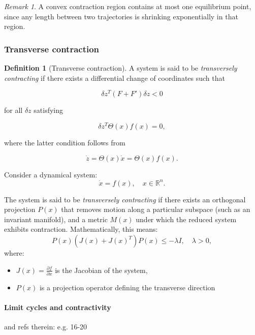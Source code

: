 \documentclass{article}
\theoremstyle{definition} \newtheorem{definition}{Definition}
\theoremstyle{remark} \newtheorem{remark}{Remark}
\newcounter{ct}
\begin{document}
\begin{remark}
A convex contraction region contains at most one equilibrium point, since any length between two trajectories is shrinking exponentially in that region.
\end{remark}

\subsubsection{Transverse contraction}
\begin{definition}[Transverse contraction] 
A system is said to be \textit{transversely contracting} if there exists a differential change of coordinates such that  

\[
\delta z^T (F + F') \delta z < 0
\]

for all \( \delta z \) satisfying  

\[
\delta z^T \Theta(x) f(x) = 0,
\]

where the latter condition follows from  

\[
\dot{z} = \Theta(x) \dot{x} = \Theta(x) f(x).
\]

\end{definition}

Consider a dynamical system:
\begin{equation}
    \dot{x} = f(x), \quad x \in \mathbb{R}^n.
\end{equation}

The system is said to be \textit{transversely contracting} if there exists an orthogonal projection $P(x)$ that removes motion along a particular subspace (such as an invariant manifold), and a metric $M(x)$ under which the reduced system exhibits contraction. Mathematically, this means:
\begin{equation}
    P(x) (J(x) + J(x)^T) P(x) \leq -\lambda I, \quad \lambda > 0,
\end{equation}
where:
\begin{itemize}
    \item $J(x) = \frac{\partial f}{\partial x}$ is the Jacobian of the system,
    \item $P(x)$ is a projection operator defining the transverse direction
\end{itemize}


\paragraph{Limit cycles and contractivity}%
\citep{manchester2014transverse} and refs therein: e.g. 16-20
\end{document}
